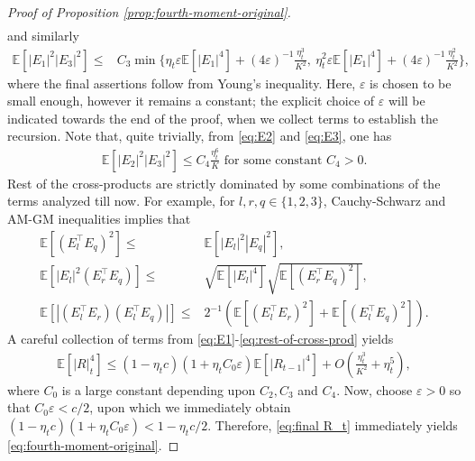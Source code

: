 \documentclass[a4paper,11pt]{article}
\numberwithin{equation}{section}
\theoremstyle{plain}
\theoremstyle{remark}
\def\IE{\mathbb{E}}
\begin{document}
\begin{proof}[Proof of Proposition \ref{prop:fourth-moment-original}]
\begin{align}
\end{align}
and similarly
\begin{align}
    \IE[|E_1|^2 |E_3|^2] \leq & C_3 \min\{\eta_t \varepsilon \IE[|E_1|^4] + (4\varepsilon)^{-1} \frac{\eta_t^3}{K^2} , \  \eta_t^2 \varepsilon \IE[|E_1|^4] + (4\varepsilon)^{-1} \frac{\eta_t^2}{K^2} \}, \label{eq:E1-cross-prods-2}
\end{align}
where the final assertions follow from Young's inequality. Here, $\varepsilon$ is chosen to be small enough, however it remains a constant; the explicit choice of $\varepsilon$ will be indicated towards the end of the proof, when we collect terms to establish the recursion. Note that, quite trivially, from \eqref{eq:E2} and \eqref{eq:E3}, one has
\begin{align}
    \IE[|E_2|^2 |E_3|^2] \leq C_4\frac{\eta_t^6}{K} \text{ for some constant $C_4>0$}. \label{eq:E2-E3}
\end{align}
Rest of the cross-products are strictly dominated by some combinations of the terms analyzed till now. For example, for $l,r, q \in \{1,2,3\}$, Cauchy-Schwarz and AM-GM inequalities implies that
\begin{align}
  \IE[(E_l^\top E_q)^2] \leq & \IE[|E_l|^2 |E_q|^2], \nonumber\\
    \IE[|E_l|^2 (E_r^\top E_q) ] \leq & \sqrt{\IE[|E_l|^4]} \sqrt{\IE[(E_r^\top E_q)^2]}, \nonumber\\
    \IE[|(E_l^\top E_r) (E_l^\top E_q)|] \leq & 2^{-1}(\IE[(E_l^\top E_r)^2] + \IE[(E_l^\top E_q)^2]) \label{eq:rest-of-cross-prod}.
\end{align}
A careful collection of terms from \eqref{eq:E1}-\eqref{eq:rest-of-cross-prod} yields
\begin{align}
    \IE[|R|_t^4]\leq (1-\eta_tc) (1+ \eta_t C_0 \varepsilon)\IE[|R_{t-1}|^4] + O(\frac{\eta_t^3}{K^2} + \eta_t^5),\label{eq:final R_t}
\end{align}
where $C_0$ is a large constant depending upon $C_2, C_3$ and $C_4$. Now, choose $\varepsilon>0$ so that $C_0\varepsilon < c/2$, upon which we immediately obtain $(1-\eta_tc) (1+ \eta_t C_0 \varepsilon)< 1- \eta_t c/2$. Therefore, \eqref{eq:final R_t} immediately yields \eqref{eq:fourth-moment-original}. 
\end{proof}
\end{document}
